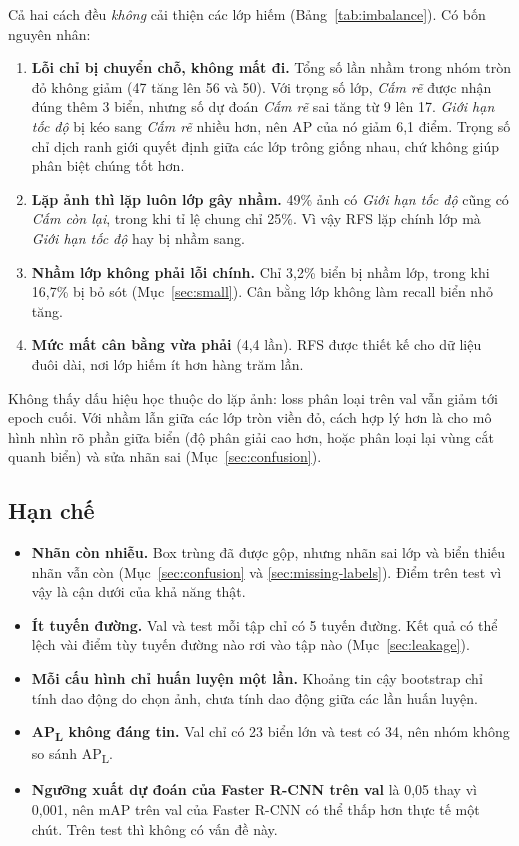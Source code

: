 Cả hai cách đều \emph{không} cải thiện các lớp hiếm (Bảng~\ref{tab:imbalance}). Có bốn nguyên nhân:
\begin{enumerate}
\item \textbf{Lỗi chỉ bị chuyển chỗ, không mất đi.} Tổng số lần nhầm trong nhóm tròn đỏ không giảm (47 tăng lên 56 và 50).
  Với trọng số lớp, \textit{Cấm rẽ} được nhận đúng thêm 3 biển, nhưng số dự đoán \textit{Cấm rẽ} sai tăng từ 9 lên 17. \textit{Giới hạn tốc độ} bị kéo sang \textit{Cấm rẽ} nhiều hơn, nên AP của nó giảm 6,1 điểm.
  Trọng số chỉ dịch ranh giới quyết định giữa các lớp trông giống nhau, chứ không giúp phân biệt chúng tốt hơn.
\item \textbf{Lặp ảnh thì lặp luôn lớp gây nhầm.} 49\% ảnh có \textit{Giới hạn tốc độ} cũng có \textit{Cấm còn lại}, trong khi tỉ lệ chung chỉ 25\%. Vì vậy RFS lặp chính lớp mà \textit{Giới hạn tốc độ} hay bị nhầm sang.
\item \textbf{Nhầm lớp không phải lỗi chính.} Chỉ 3,2\% biển bị nhầm lớp, trong khi 16,7\% bị bỏ sót (Mục~\ref{sec:small}). Cân bằng lớp không làm recall biển nhỏ tăng.
\item \textbf{Mức mất cân bằng vừa phải} (4,4 lần). RFS được thiết kế cho dữ liệu đuôi dài, nơi lớp hiếm ít hơn hàng trăm lần.
\end{enumerate}
Không thấy dấu hiệu học thuộc do lặp ảnh: loss phân loại trên val vẫn giảm tới epoch cuối.
Với nhầm lẫn giữa các lớp tròn viền đỏ, cách hợp lý hơn là cho mô hình nhìn rõ phần giữa biển (độ phân giải cao hơn, hoặc phân loại lại vùng cắt quanh biển) và sửa nhãn sai (Mục~\ref{sec:confusion}).

\subsection{Hạn chế}
\label{sec:limitations}

\begin{itemize}
\item \textbf{Nhãn còn nhiễu.} Box trùng đã được gộp, nhưng nhãn sai lớp và biển thiếu nhãn vẫn còn (Mục~\ref{sec:confusion} và \ref{sec:missing-labels}). Điểm trên test vì vậy là cận dưới của khả năng thật.
\item \textbf{Ít tuyến đường.} Val và test mỗi tập chỉ có 5 tuyến đường. Kết quả có thể lệch vài điểm tùy tuyến đường nào rơi vào tập nào (Mục~\ref{sec:leakage}).
\item \textbf{Mỗi cấu hình chỉ huấn luyện một lần.} Khoảng tin cậy bootstrap chỉ tính dao động do chọn ảnh, chưa tính dao động giữa các lần huấn luyện.
\item \textbf{AP\textsubscript{L} không đáng tin.} Val chỉ có 23 biển lớn và test có 34, nên nhóm không so sánh AP\textsubscript{L}.
\item \textbf{Ngưỡng xuất dự đoán của Faster R-CNN trên val} là 0,05 thay vì 0,001, nên mAP trên val của Faster R-CNN có thể thấp hơn thực tế một chút. Trên test thì không có vấn đề này.
\end{itemize}

